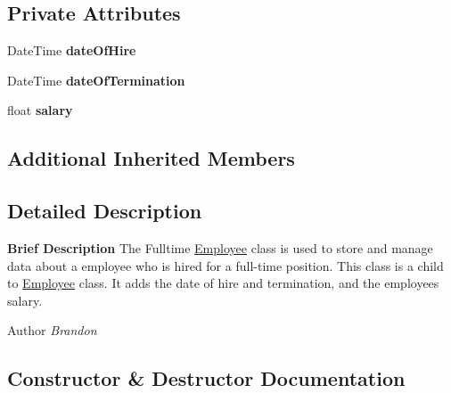 \subsection*{Private Attributes}
\begin{DoxyCompactItemize}
\item 
\hypertarget{class_all_employees_1_1_fulltime_employee_aa072bd7c652567684c77e0cfd6638af2}{}Date\+Time {\bfseries date\+Of\+Hire}\label{class_all_employees_1_1_fulltime_employee_aa072bd7c652567684c77e0cfd6638af2}

\item 
\hypertarget{class_all_employees_1_1_fulltime_employee_a3836c1a3f74f71f87652c91913eb570c}{}Date\+Time {\bfseries date\+Of\+Termination}\label{class_all_employees_1_1_fulltime_employee_a3836c1a3f74f71f87652c91913eb570c}

\item 
\hypertarget{class_all_employees_1_1_fulltime_employee_afd766110662d0321998cecb84d0dd425}{}float {\bfseries salary}\label{class_all_employees_1_1_fulltime_employee_afd766110662d0321998cecb84d0dd425}

\end{DoxyCompactItemize}
\subsection*{Additional Inherited Members}


\subsection{Detailed Description}
{\bfseries Brief Description} The Fulltime \hyperlink{class_all_employees_1_1_employee}{Employee} class is used to store and manage data about a employee who is hired for a full-\/time position. This class is a child to \hyperlink{class_all_employees_1_1_employee}{Employee} class. It adds the date of hire and termination, and the employees salary. 

\begin{DoxyAuthor}{Author}
{\itshape Brandon} 
\end{DoxyAuthor}


\subsection{Constructor \& Destructor Documentation}
\hypertarget{class_all_employees_1_1_fulltime_employee_a2f7744fed20aa3161c5ac5cd37c1a281}{}
